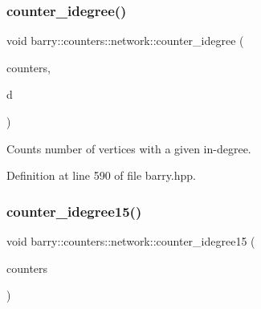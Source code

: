 \mbox{\label{namespacebarry_1_1counters_1_1network_a460e9b4cd736d8ab02ebeb6f84e3e80d}} 
\subsubsection{\texorpdfstring{counter\+\_\+idegree()}{counter\_idegree()}}
{\footnotesize\ttfamily void barry\+::counters\+::network\+::counter\+\_\+idegree (\begin{DoxyParamCaption}\item[{\hyperlink{namespacebarry_1_1counters_1_1network_aa72fdb34752ac24167a06ee196a8fff6}{Net\+Counters} $\ast$}]{counters,  }\item[{std\+::vector$<$ \hyperlink{namespacebarry_a11dfc53ddb4672278319aa04f1e09a6c}{uint} $>$}]{d }\end{DoxyParamCaption})\hspace{0.3cm}{\ttfamily [inline]}}



Counts number of vertices with a given in-\/degree. 



Definition at line 590 of file barry.\+hpp.

\mbox{\label{namespacebarry_1_1counters_1_1network_a27ece7e2bbf1ca87810c5ffbdfcce9fc}} 
\subsubsection{\texorpdfstring{counter\+\_\+idegree15()}{counter\_idegree15()}}
{\footnotesize\ttfamily void barry\+::counters\+::network\+::counter\+\_\+idegree15 (\begin{DoxyParamCaption}\item[{\hyperlink{namespacebarry_1_1counters_1_1network_aa72fdb34752ac24167a06ee196a8fff6}{Net\+Counters} $\ast$}]{counters }\end{DoxyParamCaption})\hspace{0.3cm}{\ttfamily [inline]}}



